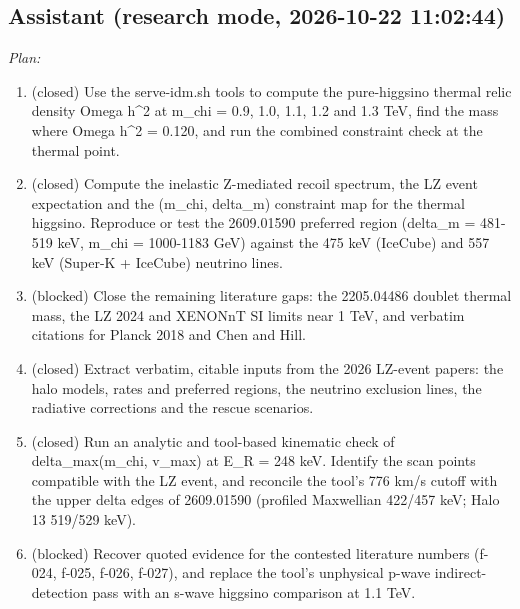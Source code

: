\documentclass[11pt,a4paper]{article}
\begin{document}
\subsection*{Assistant \small(research mode, 2026-10-22 11:02:44)}
\textit{Plan:}\begin{enumerate}
  \item (closed) Use the serve-idm.sh tools to compute the pure-higgsino thermal relic density Omega h\textasciicircum{}2 at m\_chi = 0.9, 1.0, 1.1, 1.2 and 1.3 TeV, find the mass where Omega h\textasciicircum{}2 = 0.120, and run the combined constraint check at the thermal point.
  \item (closed) Compute the inelastic Z-mediated recoil spectrum, the LZ event expectation and the (m\_chi, delta\_m) constraint map for the thermal higgsino. Reproduce or test the 2609.01590 preferred region (delta\_m = 481-519 keV, m\_chi = 1000-1183 GeV) against the 475 keV (IceCube) and 557 keV (Super-K + IceCube) neutrino lines.
  \item (blocked) Close the remaining literature gaps: the 2205.04486 doublet thermal mass, the LZ 2024 and XENONnT SI limits near 1 TeV, and verbatim citations for Planck 2018 and Chen and Hill.
  \item (closed) Extract verbatim, citable inputs from the 2026 LZ-event papers: the halo models, rates and preferred regions, the neutrino exclusion lines, the radiative corrections and the rescue scenarios.
  \item (closed) Run an analytic and tool-based kinematic check of delta\_max(m\_chi, v\_max) at E\_R = 248 keV. Identify the scan points compatible with the LZ event, and reconcile the tool's 776 km/s cutoff with the upper delta edges of 2609.01590 (profiled Maxwellian 422/457 keV; Halo 13 519/529 keV).
  \item (blocked) Recover quoted evidence for the contested literature numbers (f-024, f-025, f-026, f-027), and replace the tool's unphysical p-wave indirect-detection pass with an s-wave higgsino comparison at 1.1 TeV.
\end{enumerate}
\end{document}
